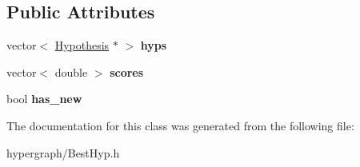 \subsection*{Public Attributes}
\begin{DoxyCompactItemize}
\item 
\hypertarget{classBestHyp_ae788664f11e5f6c5af658ce82a33e0e0}{
vector$<$ \hyperlink{structHypothesis}{Hypothesis} $\ast$ $>$ {\bfseries hyps}}
\label{classBestHyp_ae788664f11e5f6c5af658ce82a33e0e0}

\item 
\hypertarget{classBestHyp_a6488149ddc1b2ee2e4ccb4dde2ed8618}{
vector$<$ double $>$ {\bfseries scores}}
\label{classBestHyp_a6488149ddc1b2ee2e4ccb4dde2ed8618}

\item 
\hypertarget{classBestHyp_ac011edf181e6989b666cb2a5cf24a61c}{
bool {\bfseries has\_\-new}}
\label{classBestHyp_ac011edf181e6989b666cb2a5cf24a61c}

\end{DoxyCompactItemize}


The documentation for this class was generated from the following file:\begin{DoxyCompactItemize}
\item 
hypergraph/BestHyp.h\end{DoxyCompactItemize}
